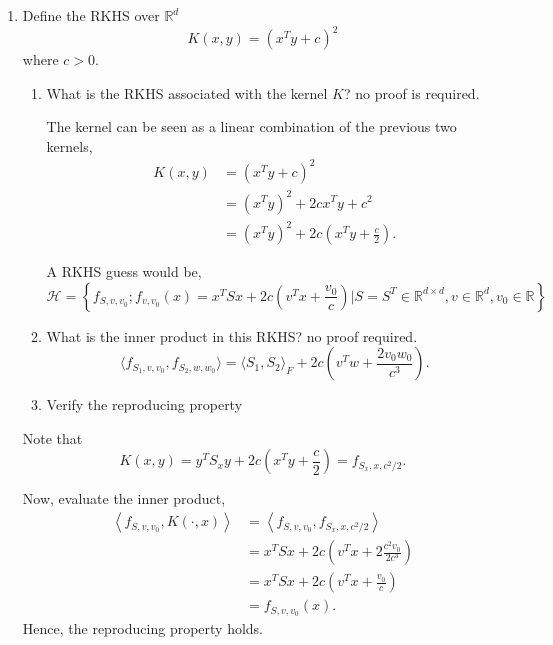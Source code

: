 \documentclass{article}[12pt]
\begin{document}
\begin{enumerate}
\begin{enumerate}
\end{enumerate}
\item Define the RKHS  over $\mathbb{R}^d$
$$K(x,y)=(x^Ty+c)^2$$
where $c>0$. 
\begin{enumerate}
\item
What is the RKHS associated with the kernel $K$? no proof is required. 

The kernel can be seen as a linear combination of the previous two kernels,
\begin{equation}
\begin{aligned}
K(x, y)&=\left(x^{T} y+c\right)^{2} \\
&= \left( x^T y\right)^2 + 2cx^Ty+c^2 \\
&=  \left( x^T y\right)^2  + 2c \left( x^Ty + \frac{c}{2} \right).
\end{aligned}
\end{equation}

A RKHS guess would be,
\begin{equation}
\mathcal{H}=\left\{f_{S,v, v_{0}} ; f_{v, v_{0}}(x)= x^TSx+2c \left(v^{T} x+\frac{v_{0}}{c} \right) | S = S^T \in \mathbb R^{d\times d}, v \in \mathbb{R}^{d}, v_{0} \in \mathbb{R}\right\}
\end{equation}
\item 
What is the inner product in this RKHS? no proof required.  
\begin{equation}
\langle f_{S_1, v, v_0}, f_{S_2, w, w_0} \rangle = \langle S_1, S_2 \rangle_F + 2c \left( v^T w + \frac{2v_0w_0}{c^3}\right).
\end{equation}
\item 
Verify the reproducing property
\end{enumerate}
Note that
\begin{equation}
K(x, y) = y^TS_x y+2c \left( x^Ty + \frac{c}{2}\right) = f_{S_x,x,c^2/2}.
\end{equation}

Now, evaluate the inner product,
\begin{equation}
\begin{aligned}\left\langle f_{S, v, v_{0}}, K(\cdot , x)\right\rangle &=\left\langle f_{S, v, v_{0}}, f_{S_{x}, x, c^{2} / 2}\right\rangle \\ &= x^{T} S x+2 c\left(v^{T} x+2 \frac{c^{2} v_{0}}{2 c^{3}}\right) \\ 
&= x^{T} S x+2 c\left(v^{T} x+\frac{ v_{0}}{c}\right) \\
&= f_{S, v, v_0}(x). \end{aligned}
\end{equation}
Hence, the reproducing property holds.
\end{enumerate}
\end{document}
